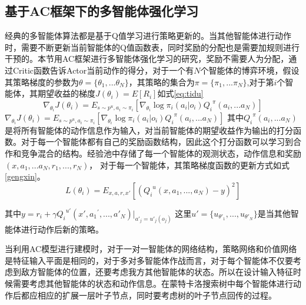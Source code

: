 \subsection{基于AC框架下的多智能体强化学习}
经典的多智能体算法都是基于Q值学习进行策略更新的。当其他智能体进行动作时，需要不断更新当前智能体的Q值函数表，同时奖励的分配也是需要加规则进行干预的。本节用AC框架进行多智能体强化学习的研究，奖励不需要人为分配，通过Critic函数告诉Actor当前动作的得分，对于一个有$N$个智能体的博弈环境，假设其策略梯度的参数为$\theta  = \{ {\theta _1},...{\theta _N}\} $，其策略的集合为$\pi  = \{ {\pi _1},...{\pi _N}\} $,对于第$i$个智能体，其期望收益的梯度$J({\theta _i}) = E[{R_i}]$如式\ref{eq:tidu}
\begin{equation}
\label{eq:tidu}
{\nabla _{{\theta _i}}}J({\theta _i}) = {E_{s \sim {p^u},{a_i} \sim {\pi _i}}}[{\nabla _{{\theta _i}}}\log {\pi _i}({a_i}|{o_i}){Q_i}^\pi ({a_i},...{a_N})]
\end{equation}
${\nabla _{{\theta _i}}}J({\theta _i}) = {E_{s \sim {p^u},{a_i} \sim {\pi _i}}}[{\nabla _{{\theta _i}}}\log {\pi _i}({a_i}|{o_i}){Q_i}^\pi ({a_i},...{a_N})]$
其中${Q_i}^\pi ({a_i},...{a_N})$是将所有智能体的动作信息作为输入，对当前智能体的期望收益作为输出的打分函数。对于每一个智能体都有自己的奖励函数结构，因此这个打分函数可以学习到合作和竞争混合的结构。经验池中存储了每一个智能体的观测状态，动作信息和奖励$(x,{a_1},...{a_N},{r_1},...,{r_N})$，
对于每一个智能体，其策略梯度函数的更新方式如式\ref{gengxin}。
\begin{equation}
\label{gengxin}
L({\theta _i}) = {E_{x,a,r,x'}}[{({Q_i}^u(x,{a_1},...,{a_N}) - y)^2}]
\end{equation}

其中$y = {r_i} + \gamma {Q_i}^{u'}(x',{a_1}^\prime ,...,{a'_N}){|_{{{a'}_j} = {{u'}_j}({o_j})}}$
这里$u' = \{ {u_{{{\theta '}_1}}},...,{u_{{{\theta '}_N}}}\} $是当其他智能体进行动作后新的策略。

当利用AC模型进行建模时，对于一对一智能体的网络结构，策略网络和价值网络是特征输入平面是相同的，对于多对多智能体作战而言，对于每个智能体不仅要考虑到敌方智能体的位置，还要考虑我方其他智能体的状态。所以在设计输入特征时候需要考虑其他智能体的状态和动作信息。在蒙特卡洛搜索树中每个智能体进行动作后都应相应的扩展一层叶子节点，同时要考虑树的叶子节点回传的过程。
